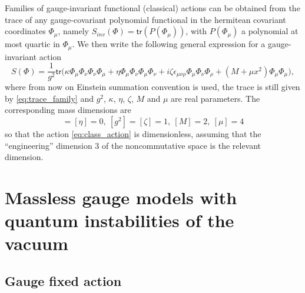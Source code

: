 \documentclass[11pt]{book}
\newcommand{\tr}{\mathsf{tr}}
\theoremstyle{break}
\begin{document}
Families of gauge-invariant functional (classical) actions can be obtained from the trace of any gauge-covariant polynomial functional in the hermitean covariant coordinates $\Phi_\mu$, namely $S_{inv}(\Phi)=\tr\left(P(\Phi_\mu)\right)$, with $P(\Phi_\mu)$ a polynomial at most quartic in $\Phi_\mu$. We then write the following general expression for a gauge-invariant action
%
\begin{equation}
S(\Phi) = \frac{1}{g^2} \tr\big( \kappa \Phi_\mu \Phi_\nu \Phi_\nu \Phi_\mu + \eta \Phi_\mu \Phi_\nu \Phi_\mu \Phi_\nu + i \zeta \epsilon_{\mu\nu\rho} \Phi_\mu \Phi_\nu \Phi_\rho + (M+\mu x^2) \Phi_\mu \Phi_\mu \big), 
\label{eq:class_action}
\end{equation}
%
where from now on Einstein summation convention is used, the trace is still given by \eqref{eq:trace_family} and $g^2$, $\kappa$, $\eta$, $\zeta$, $M$ and $\mu$ are real parameters. The corresponding mass dimensions are
%
\begin{equation}
[\kappa]=[\eta]=0,\ [g^2]=[\zeta]=1,\ [M]=2,\ [\mu]=4\label{mass-dim}
\end{equation}
%
so that the action \eqref{eq:class_action} is dimensionless, assuming that the ``engineering'' dimension $3$ of the noncommutative space is the relevant dimension.


\section*{Massless gauge models with quantum instabilities of the vacuum}


\subsection*{Gauge fixed action}
\end{document}

